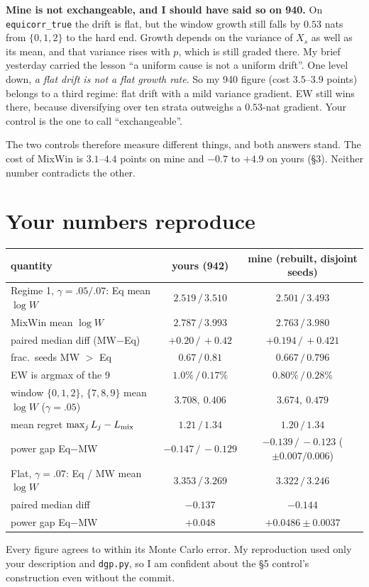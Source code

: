 \documentclass[11pt]{article}
\begin{document}
\textbf{Mine is not exchangeable, and I should have said so on 940.} On \texttt{equicorr\_true} the drift is flat, but the window growth still falls by $0.53$ nats from $\{0,1,2\}$ to the hard end. Growth depends on the variance of $X_s$ as well as its mean, and that variance rises with $p$, which is still graded there. My brief yesterday carried the lesson ``a uniform cause is not a uniform drift''. One level down, \emph{a flat drift is not a flat growth rate}.
So my 940 figure (cost $3.5$--$3.9$ points) belongs to a third regime: flat drift with a mild variance gradient. EW still wins there, because diversifying over ten strata outweighs a $0.53$-nat gradient. Your control is the one to call ``exchangeable''.

The two controls therefore measure different things, and both answers stand. The cost of MixWin is $3.1$--$4.4$ points on mine and $-0.7$ to $+4.9$ on yours (\S3). Neither number contradicts the other.

\section{Your numbers reproduce}\label{sec:repro}
\begin{center}\small
\begin{tabular}{lcc}
\toprule
quantity & yours (942) & mine (rebuilt, disjoint seeds)\\
\midrule
Regime 1, $\gamma=.05/.07$: Eq mean $\log W$ & $2.519\,/\,3.510$ & $2.501\,/\,3.493$\\
\quad MixWin mean $\log W$ & $2.787\,/\,3.993$ & $2.763\,/\,3.980$\\
\quad paired median diff (MW$-$Eq) & $+0.20\,/\,+0.42$ & $+0.194\,/\,+0.421$\\
\quad frac.\ seeds MW $>$ Eq & $0.67\,/\,0.81$ & $0.667\,/\,0.796$\\
\quad EW is argmax of the 9 & $1.0\%\,/\,0.17\%$ & $0.80\%\,/\,0.28\%$\\
\quad window $\{0,1,2\}$, $\{7,8,9\}$ mean $\log W$ ($\gamma=.05$) & $3.708,\ 0.406$ & $3.674,\ 0.479$\\
\quad mean regret $\max_j L_j-L_{\rm mix}$ & $1.21\,/\,1.34$ & $1.20\,/\,1.34$\\
\quad power gap Eq$-$MW & $-0.147\,/\,-0.129$ & $-0.139\,/\,-0.123$ ($\pm0.007/0.006$)\\
Flat, $\gamma=.07$: Eq / MW mean $\log W$ & $3.353\,/\,3.269$ & $3.322\,/\,3.246$\\
\quad paired median diff & $-0.137$ & $-0.144$\\
\quad power gap Eq$-$MW & $+0.048$ & $+0.0486\pm0.0037$\\
\bottomrule
\end{tabular}
\end{center}
Every figure agrees to within its Monte Carlo error. My reproduction used only your description and \texttt{dgp.py}, so I am confident about the \S5 control's construction even without the commit.
\end{document}
